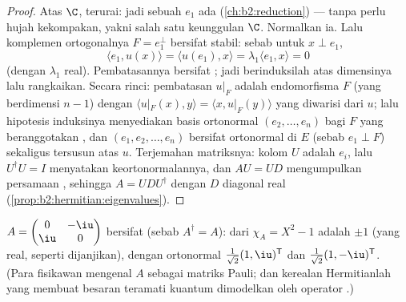 \begin{proof}
Atas $\C$,  terurai: jadi sebuah 
$e_1$ ada (\cref{ch:b2:reduction}) --- tanpa perlu hujah kekompakan,
yakni salah satu keunggulan $\C$. Normalkan ia. Lalu komplemen
ortogonalnya $F = e_1^\perp$ bersifat stabil: sebab untuk $x \perp e_1$,
\[
\langle e_1, u(x)\rangle = \langle u(e_1), x\rangle
= \lambda_1\langle e_1, x\rangle = 0
\]
(dengan $\lambda_1$ real). Pembatasannya bersifat ; jadi
berinduksilah atas dimensinya lalu rangkaikan. Secara rinci: pembatasan $u|_F$
adalah endomorfisma  $F$ (yang berdimensi $n - 1$)
dengan $\langle u|_F(x), y\rangle = \langle x, u|_F(y)\rangle$
yang diwarisi dari $u$; lalu hipotesis induksinya menyediakan basis
ortonormal $(e_2, \dots, e_n)$ bagi $F$ yang beranggotakan ,
dan $(e_1, e_2, \dots, e_n)$ bersifat ortonormal di $E$ (sebab $e_1 \perp
F$) sekaligus tersusun atas  $u$. Terjemahan matriksnya:
kolom $U$ adalah $e_i$, lalu $U^\dagger U = I$ menyatakan
keortonormalannya, dan $AU = UD$ mengumpulkan persamaan , sehingga $A = UDU^\dagger$ dengan $D$ diagonal real
(\cref{prop:b2:hermitian:eigenvalues}).
\end{proof}

\begin{example}\label{ex:b2:hermitian:pauli}
$A = \begin{pmatrix} 0 & -\iu\\ \iu & 0\end{pmatrix}$ bersifat 
(sebab $A^\dagger = A$):  dari $\chi_A = X^2 - 1$ adalah $\pm 1$
(yang real, seperti dijanjikan), dengan  ortonormal
$\frac{1}{\sqrt2}(1, \iu)^{\mathsf T}$ dan $\frac{1}{\sqrt2}(1,
-\iu)^{\mathsf T}$. (Para fisikawan mengenal $A$ sebagai matriks Pauli; dan
kerealan  Hermitianlah yang membuat besaran teramati kuantum dimodelkan
oleh operator .)
\end{example}

